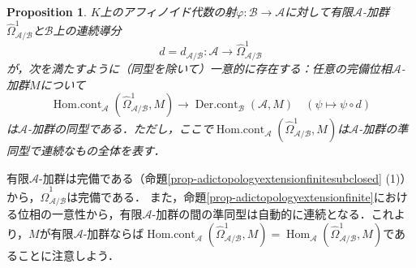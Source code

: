 \documentclass[a4paper,12pt, dvipdfmx]{jsbook}
\def\Hom{\mathop{\mathrm{Hom}}\nolimits}
\def\Homcont{\mathop{\mathrm{Hom.cont}}\nolimits}
\def\Dercont{\mathop{\mathrm{Der.cont}}\nolimits}
\theoremstyle{plain}
\newtheorem{prop}[thm]{\bfseries Proposition}
\theoremstyle{definition}
\begin{document}
\begin{prop}\label{prop-differentialmodule}{\rm 
$K$上のアフィノイド代数の射$\varphi\colon\mathcal{B}\rightarrow\mathcal{A}$に対して有限$\mathcal{A}$-加群$\widehat{\Omega}^1_{\mathcal{A}/\mathcal{B}}$と$\mathcal{B}$上の連続導分
$$
d=d_{\mathcal{A}/\mathcal{B}}\colon\mathcal{A}\longrightarrow\widehat{\Omega}^1_{\mathcal{A}/\mathcal{B}}
$$
が，次を満たすように（同型を除いて）一意的に存在する：任意の完備位相$\mathcal{A}$-加群$M$について
$$
\Homcont_{\mathcal{A}}(\widehat{\Omega}^1_{\mathcal{A}/\mathcal{B}},M)\longrightarrow\Dercont_{\mathcal{B}}(\mathcal{A},M)\quad(\psi\longmapsto\psi\circ d)
$$
は$\mathcal{A}$-加群の同型である．ただし，ここで$\Homcont_{\mathcal{A}}(\widehat{\Omega}^1_{\mathcal{A}/\mathcal{B}},M)$は$\mathcal{A}$-加群の準同型で連続なもの全体を表す．}
\end{prop}

有限$\mathcal{A}$-加群は完備である（命題\ref{prop-adictopologyextensionfinitesubclosed} (1)）から，$\widehat{\Omega}^1_{\mathcal{A}/\mathcal{B}}$は完備である．
また，命題\ref{prop-adictopologyextensionfinite}における位相の一意性から，有限$\mathcal{A}$-加群の間の準同型は自動的に連続となる．これより，$M$が有限$\mathcal{A}$-加群ならば$\Homcont_{\mathcal{A}}(\widehat{\Omega}^1_{\mathcal{A}/\mathcal{B}},M)=\Hom_{\mathcal{A}}(\widehat{\Omega}^1_{\mathcal{A}/\mathcal{B}},M)$であることに注意しよう．
\end{document}
